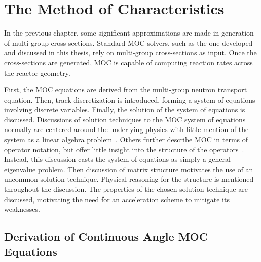\chapter{The Method of Characteristics}
\label{chap:moc}

In the previous chapter, some significant approximations are made in generation of multi-group cross-sections. Standard \ac{MOC} solvers, such as the one developed and discussed in this thesis, rely on multi-group cross-sections as input. Once the cross-sections are generated, \ac{MOC} is capable of computing reaction rates across the reactor geometry.

First, the \ac{MOC} equations are derived from the multi-group neutron transport equation. Then, track discretization is introduced, forming a system of equations involving discrete variables. Finally, the solution of the system of equations is discussed. Discussions of solution techniques to the \ac{MOC} system of equations normally are centered around the underlying physics with little mention of the system as a linear algebra problem~\cite{boyd2014openmoc}. Others further describe \ac{MOC} in terms of operator notation, but offer little insight into the structure of the operators~\cite{kochunas}. Instead, this discussion casts the system of equations as simply a general eigenvalue problem. Then discussion of matrix structure motivates the use of an uncommon solution technique. Physical reasoning for the structure is mentioned throughout the discussion. The properties of the chosen solution technique are discussed, motivating the need for an acceleration scheme to mitigate its weaknesses.


\section{Derivation of Continuous Angle MOC Equations}
\label{sec:derivation-of-moc}

